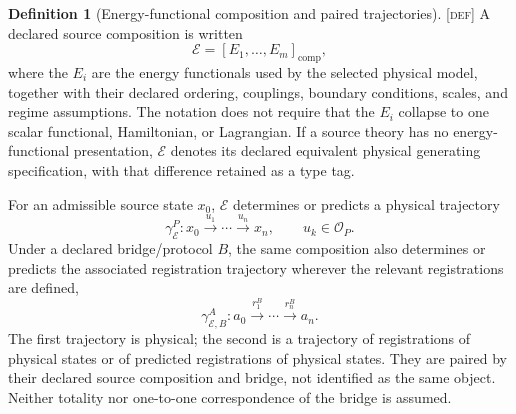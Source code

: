 \documentclass[11pt]{article}
\newcommand{\Defn}{\textsc{[def]}}
\theoremstyle{definition}
\newtheorem{sdefinition}{Definition}
\begin{document}
\begin{sdefinition}[Energy-functional composition and paired trajectories]
\label{def:energy-composition-paired-trajectories}
\Defn{} A declared source composition is written
\begin{equation}
\mathcal E=[E_1,\ldots,E_m]_{\mathrm{comp}},
\label{eq:energy-functional-composition}
\end{equation}
where the $E_i$ are the energy functionals used by the selected physical model,
together with their declared ordering, couplings, boundary conditions, scales, and
regime assumptions. The notation does not require that the $E_i$ collapse to one
scalar functional, Hamiltonian, or Lagrangian. If a source theory has no
energy-functional presentation, $\mathcal E$ denotes its declared equivalent
physical generating specification, with that difference retained as a type tag.

For an admissible source state $x_0$, $\mathcal E$ determines or predicts a
physical trajectory
\begin{equation}
\gamma^P_{\mathcal E}:
 x_0\xrightarrow{u_1}\cdots\xrightarrow{u_n}x_n,
 \qquad u_k\in\mathcal O_P.
\label{eq:paired-p-trajectory}
\end{equation}
Under a declared bridge/protocol $B$, the same composition also determines or
predicts the associated registration trajectory wherever the relevant
registrations are defined,
\begin{equation}
\gamma^A_{\mathcal E,B}:
 a_0\xrightarrow{r_1^B}\cdots\xrightarrow{r_n^B}a_n.
\label{eq:paired-a-trajectory}
\end{equation}
The first trajectory is physical; the second is a trajectory of registrations of
physical states or of predicted registrations of physical states. They are paired
by their declared source composition and bridge, not identified as the same object.
Neither totality nor one-to-one correspondence of the bridge is assumed.
\end{sdefinition}
\end{document}
